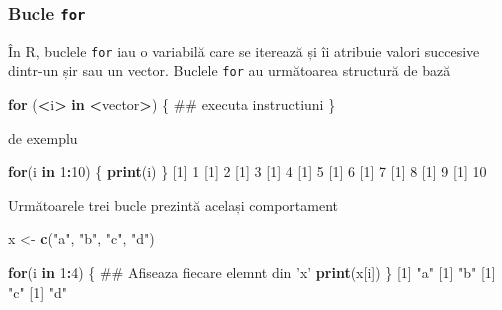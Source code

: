 \documentclass[]{article}
\newenvironment{Shaded}{\begin{snugshade}}{\end{snugshade}}
\newcommand{\KeywordTok}[1]{\textcolor[rgb]{0.13,0.29,0.53}{\textbf{#1}}}
\newcommand{\DecValTok}[1]{\textcolor[rgb]{0.00,0.00,0.81}{#1}}
\newcommand{\StringTok}[1]{\textcolor[rgb]{0.31,0.60,0.02}{#1}}
\newcommand{\ControlFlowTok}[1]{\textcolor[rgb]{0.13,0.29,0.53}{\textbf{#1}}}
\newcommand{\OperatorTok}[1]{\textcolor[rgb]{0.81,0.36,0.00}{\textbf{#1}}}
\newcommand{\NormalTok}[1]{#1}
\begin{document}
\subsubsection{\texorpdfstring{Bucle
\texttt{for}}{Bucle for}}\label{bucle-for}

În R, buclele \texttt{for} iau o variabilă care se iterează și îi
atribuie valori succesive dintr-un șir sau un vector. Buclele
\texttt{for} au următoarea structură de bază

\begin{Shaded}
\begin{Highlighting}[]
\ControlFlowTok{for}\NormalTok{ (}\OperatorTok{<}\NormalTok{i}\OperatorTok{>}\StringTok{ }\ControlFlowTok{in} \OperatorTok{<}\NormalTok{vector}\OperatorTok{>}\NormalTok{) \{}
\NormalTok{        ## executa instructiuni}
\NormalTok{\} }
\end{Highlighting}
\end{Shaded}

de exemplu

\begin{Shaded}
\begin{Highlighting}[]
\ControlFlowTok{for}\NormalTok{(i }\ControlFlowTok{in} \DecValTok{1}\OperatorTok{:}\DecValTok{10}\NormalTok{) \{}
        \KeywordTok{print}\NormalTok{(i)}
\NormalTok{\}}
\NormalTok{[}\DecValTok{1}\NormalTok{] }\DecValTok{1}
\NormalTok{[}\DecValTok{1}\NormalTok{] }\DecValTok{2}
\NormalTok{[}\DecValTok{1}\NormalTok{] }\DecValTok{3}
\NormalTok{[}\DecValTok{1}\NormalTok{] }\DecValTok{4}
\NormalTok{[}\DecValTok{1}\NormalTok{] }\DecValTok{5}
\NormalTok{[}\DecValTok{1}\NormalTok{] }\DecValTok{6}
\NormalTok{[}\DecValTok{1}\NormalTok{] }\DecValTok{7}
\NormalTok{[}\DecValTok{1}\NormalTok{] }\DecValTok{8}
\NormalTok{[}\DecValTok{1}\NormalTok{] }\DecValTok{9}
\NormalTok{[}\DecValTok{1}\NormalTok{] }\DecValTok{10}
\end{Highlighting}
\end{Shaded}

Următoarele trei bucle prezintă același comportament

\begin{Shaded}
\begin{Highlighting}[]
\NormalTok{x <-}\StringTok{ }\KeywordTok{c}\NormalTok{(}\StringTok{"a"}\NormalTok{, }\StringTok{"b"}\NormalTok{, }\StringTok{"c"}\NormalTok{, }\StringTok{"d"}\NormalTok{)}

\ControlFlowTok{for}\NormalTok{(i }\ControlFlowTok{in} \DecValTok{1}\OperatorTok{:}\DecValTok{4}\NormalTok{) \{}
\NormalTok{        ## Afiseaza fiecare elemnt din 'x'}
        \KeywordTok{print}\NormalTok{(x[i])  }
\NormalTok{\}}
\NormalTok{[}\DecValTok{1}\NormalTok{] }\StringTok{"a"}
\NormalTok{[}\DecValTok{1}\NormalTok{] }\StringTok{"b"}
\NormalTok{[}\DecValTok{1}\NormalTok{] }\StringTok{"c"}
\NormalTok{[}\DecValTok{1}\NormalTok{] }\StringTok{"d"}
\end{Highlighting}
\end{Shaded}
\end{document}
